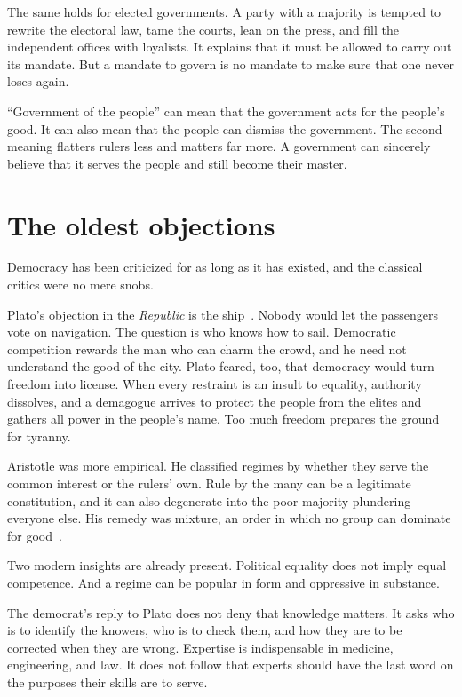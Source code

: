 \documentclass[12pt,a4paper]{book}
\begin{document}
The same holds for elected governments. A party with a majority is tempted to rewrite the electoral law, tame the courts, lean on the press, and fill the independent offices with loyalists. It explains that it must be allowed to carry out its mandate. But a mandate to govern is no mandate to make sure that one never loses again.

``Government of the people'' can mean that the government acts for the people's good. It can also mean that the people can dismiss the government. The second meaning flatters rulers less and matters far more. A government can sincerely believe that it serves the people and still become their master.

\section{The oldest objections}

Democracy has been criticized for as long as it has existed, and the classical critics were no mere snobs.

Plato's objection in the \emph{Republic} is the ship~\cite{plato-republic}. Nobody would let the passengers vote on navigation. The question is who knows how to sail. Democratic competition rewards the man who can charm the crowd, and he need not understand the good of the city. Plato feared, too, that democracy would turn freedom into license. When every restraint is an insult to equality, authority dissolves, and a demagogue arrives to protect the people from the elites and gathers all power in the people's name. Too much freedom prepares the ground for tyranny.

Aristotle was more empirical. He classified regimes by whether they serve the common interest or the rulers' own. Rule by the many can be a legitimate constitution, and it can also degenerate into the poor majority plundering everyone else. His remedy was mixture, an order in which no group can dominate for good~\cite{barnes-aristotle}.

Two modern insights are already present. Political equality does not imply equal competence. And a regime can be popular in form and oppressive in substance.

The democrat's reply to Plato does not deny that knowledge matters. It asks who is to identify the knowers, who is to check them, and how they are to be corrected when they are wrong. Expertise is indispensable in medicine, engineering, and law. It does not follow that experts should have the last word on the purposes their skills are to serve.
\end{document}
